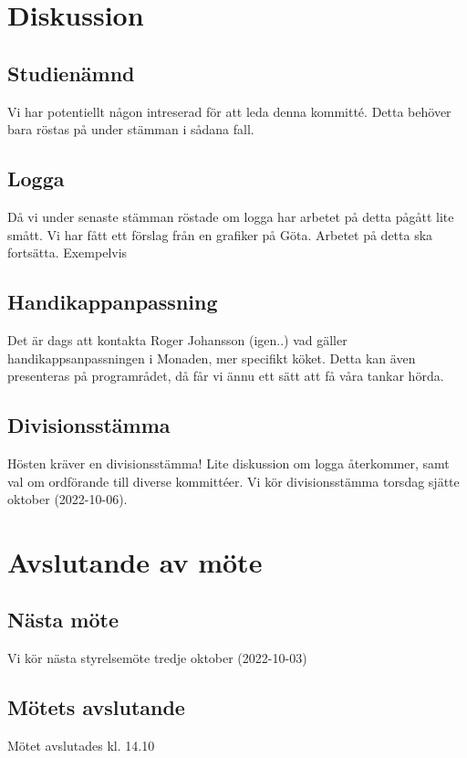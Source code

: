 \documentclass[protokoll]{dvd}
\begin{document}

\section{Diskussion}

    \subsection{Studienämnd}
    Vi har potentiellt någon intreserad för att leda denna kommitté. Detta behöver bara röstas på
    under stämman i sådana fall.

    \subsection{Logga}
    Då vi under senaste stämman röstade om logga har arbetet på detta pågått lite smått.
    Vi har fått ett förslag från en grafiker på Göta. Arbetet på detta ska fortsätta.
    Exempelvis 

    \subsection{Handikappanpassning}
    Det är dags att kontakta Roger Johansson (igen..)
    vad gäller handikappsanpassningen i Monaden, mer specifikt köket.
    Detta kan även presenteras på programrådet, då får vi ännu ett sätt att få våra
    tankar hörda.

    \subsection{Divisionsstämma}
    Hösten kräver en divisionsstämma! Lite diskussion om logga återkommer, samt val om ordförande
    till diverse kommittéer. Vi kör divisionsstämma torsdag sjätte oktober (2022-10-06).

\section{Avslutande av möte}


\subsection{Nästa möte}

Vi kör nästa styrelsemöte tredje oktober (2022-10-03)

\subsection{Mötets avslutande}

Mötet avslutades kl. 14.10

\styrelsesignaturer
\end{document}
